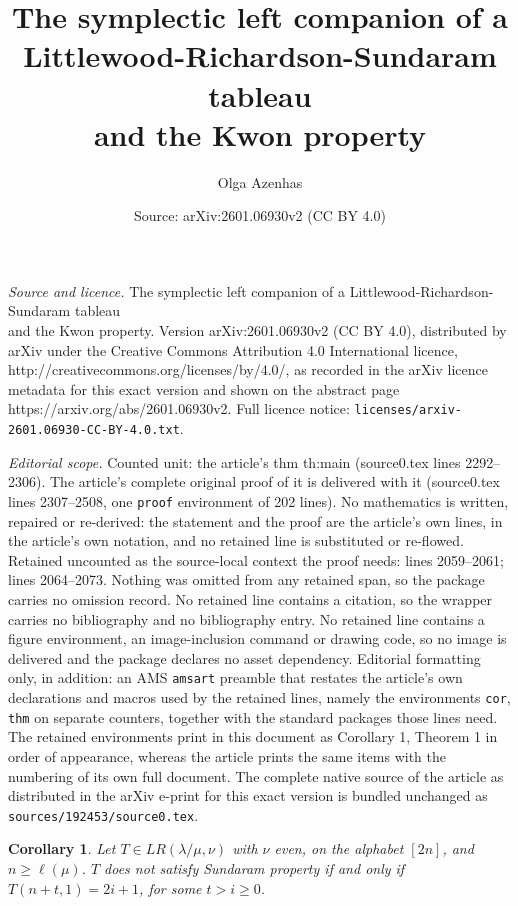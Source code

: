 \documentclass[10pt,a4paper]{amsart}
\title{The symplectic left companion of a Littlewood-Richardson-Sundaram tableau \\and the Kwon property}
\author{Olga Azenhas}
\date{Source: arXiv:2601.06930v2 (CC BY 4.0)}
\newtheorem{cor}{Corollary}
\begin{document}
\maketitle

\noindent\emph{Source and licence.} The symplectic left companion of a Littlewood-Richardson-Sundaram tableau \\and the Kwon property. Version arXiv:2601.06930v2 (CC BY 4.0), distributed by arXiv under the Creative Commons Attribution 4.0 International licence, http://creativecommons.org/licenses/by/4.0/, as recorded in the arXiv licence metadata for this exact version and shown on the abstract page https://arxiv.org/abs/2601.06930v2. Full licence notice: \texttt{licenses/arxiv-2601.06930-CC-BY-4.0.txt}.\par\smallskip

\noindent\textit{Editorial scope.} Counted unit: the article's thm th:main (source0.tex lines 2292--2306). The article's complete original proof of it is delivered with it (source0.tex lines 2307--2508, one \texttt{proof} environment of 202 lines). No mathematics is written, repaired or re-derived: the statement and the proof are the article's own lines, in the article's own notation, and no retained line is substituted or re-flowed.  Retained uncounted as the source-local context the proof needs: lines 2059--2061; lines 2064--2073.  Nothing was omitted from any retained span, so the package carries no omission record.  No retained line contains a citation, so the wrapper carries no bibliography and no bibliography entry.  No retained line contains a figure environment, an image-inclusion command or drawing code, so no image is delivered and the package declares no asset dependency.  Editorial formatting only, in addition: an AMS \texttt{amsart} preamble that restates the article's own declarations and macros used by the retained lines, namely the environments \texttt{cor}, \texttt{thm} on separate counters, together with the standard packages those lines need.  The retained environments print in this document as Corollary 1, Theorem 1 in order of appearance, whereas the article prints the same items with the numbering of its own full document.  The complete native source of the article as distributed in the arXiv e-print for this exact version is bundled unchanged as \texttt{sources/192453/source0.tex}.
\begin{cor} \label{neglrs} Let $T\in LR(\lambda/\mu,\nu)$ with $\nu$ even, on the alphabet $[2n]$, and $n\ge \ell(\mu)$. $T$ does not satisfy Sundaram property if and only if $T(n+t,1)=2i+1$, for some  $t> i\ge 0$.

\end{cor}
\end{document}
